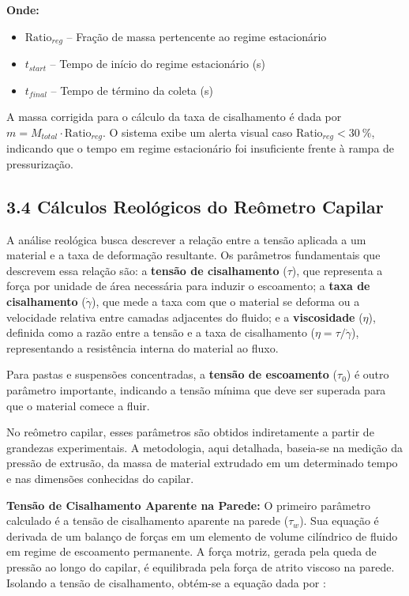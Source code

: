 \documentclass[a4paper,12pt]{article}
\begin{document}
\textbf{Onde:}
\begin{itemize}[leftmargin=1.5em]
  \item $\text{Ratio}_{reg}$ -- Fração de massa pertencente ao regime estacionário
  \item $t_{start}$ -- Tempo de início do regime estacionário (\si{s})
  \item $t_{final}$ -- Tempo de término da coleta (\si{s})
\end{itemize}

A massa corrigida para o cálculo da taxa de cisalhamento é dada por $m = M_{total} \cdot \text{Ratio}_{reg}$. O sistema exibe um alerta visual caso $\text{Ratio}_{reg} < \SI{30}{\percent}$, indicando que o tempo em regime estacionário foi insuficiente frente à rampa de pressurização.

\subsection*{3.4 Cálculos Reológicos do Reômetro Capilar}
A análise reológica busca descrever a relação entre a tensão aplicada a um material e a taxa de deformação resultante. Os parâmetros fundamentais que descrevem essa relação são: a \textbf{tensão de cisalhamento} ($\tau$), que representa a força por unidade de área necessária para induzir o escoamento; a \textbf{taxa de cisalhamento} ($\dot{\gamma}$), que mede a taxa com que o material se deforma ou a velocidade relativa entre camadas adjacentes do fluido; e a \textbf{viscosidade} ($\eta$), definida como a razão entre a tensão e a taxa de cisalhamento ($\eta = \tau / \dot{\gamma}$), representando a resistência interna do material ao fluxo.

Para pastas e suspensões concentradas, a \textbf{tensão de escoamento} ($\tau_0$) é outro parâmetro importante, indicando a tensão mínima que deve ser superada para que o material comece a fluir.

No reômetro capilar, esses parâmetros são obtidos indiretamente a partir de gran\-de\-zas experimentais. A metodologia, aqui detalhada, baseia-se na medição da pressão de extrusão, da massa de material extrudado em um determinado tempo e nas dimensões conhecidas do capilar.

\textbf{Tensão de Cisalhamento Aparente na Parede:} O primeiro parâmetro calculado é a tensão de cisalhamento aparente na parede ($\tau_w$). Sua equação é derivada de um balanço de forças em um elemento de volume cilíndrico de fluido em regime de escoamento permanente. A força motriz, gerada pela queda de pressão ao longo do capilar, é equilibrada pela força de atrito viscoso na parede. Isolando a tensão de cisalhamento, obtém-se a equação dada por \cite{barnes1989}:
\end{document}
